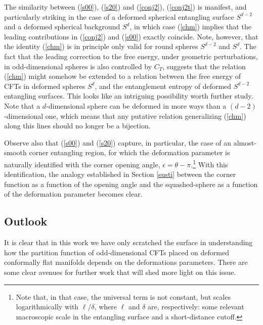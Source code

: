\documentclass[12pt]{article}
\numberwithin{equation}{section}
\newcommand{\req}[1]{(\ref{#1})} %
\newcommand{\ssc}{\scriptscriptstyle}
\newcommand{\ctt}{C_{\ssc T}}
\begin{document}
The similarity between \req{s00}, \req{s20} and \req{conj2}, \req{conj2t} is manifest, and particularly striking in the case of a deformed spherical entangling surface $S^{d-2}$ and a deformed spherical background $S^d$, in which case \req{chm} implies that the leading contributions in \req{conj2} and \req{s00} exactly coincide. Note, however, that the identity \req{chm} is in principle only valid for round spheres $S^{d-2}$ and $S^d$. The fact that the leading correction to the free energy, under geometric perturbations,  in odd-dimensional spheres is also controlled by $\ctt$, suggests that the relation \req{chm} might somehow be extended to a relation between the free energy of CFTs in deformed spheres $S^d$, and the entanglement entropy of deformed $S^{d-2}$ entangling surfaces. This looks like an intriguing possibility worth further study. Note that a $d$-dimensional sphere can be deformed in more ways than a $(d-2)$-dimensional one, which means that any putative relation generalizing \req{chm} along this lines should no longer be a bijection.

Observe also that \req{s00} and \req{s20} capture, in particular, the case of an almost-smooth corner entangling region, for which the deformation parameter is naturally identified with the corner opening angle, $\epsilon= \theta-\pi$.\footnote{Note that, in that case, the universal term is not constant, but scales logarithmically with $\ell/\delta$, where $\ell$ and $\delta$ are, respectively: some relevant macroscopic scale in the entangling surface and a short-distance cutoff.} With this identification, the analogy established in Section \ref{susti} between the corner function as a function of the opening angle and the squashed-sphere as a function of the deformation parameter becomes clear.

\subsection{Outlook}

It is clear that in this work we have only scratched the surface in understanding how the partition function of odd-dimensional CFTs placed on deformed conformally flat manifolds depends on the deformations parameters. There are some clear avenues for further work that will shed more light on this issue. 
\end{document}
